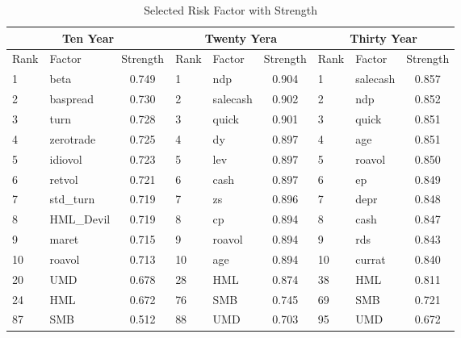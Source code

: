 \begin{table}[]
	\centering
	\caption{Selected Risk Factor with Strength}
	\begin{tabular}{llc|llc|llc}
		\hline
		\multicolumn{3}{c|}{Ten Year} & \multicolumn{3}{c|}{Twenty Yera} & \multicolumn{3}{c}{Thirty Year} \\ \hline
		Rank & Factor     & Strength & Rank   & Factor     & Strength   & Rank   & Factor     & Strength   \\ \hline
		1    & beta       & 0.749    & 1      & ndp        & 0.904      & 1      & salecash   & 0.857      \\
		2    & baspread   & 0.730    & 2      & salecash   & 0.902      & 2      & ndp        & 0.852      \\
		3    & turn       & 0.728    & 3      & quick      & 0.901      & 3      & quick      & 0.851      \\
		4    & zerotrade  & 0.725    & 4      & dy         & 0.897      & 4      & age        & 0.851      \\
		5    & idiovol    & 0.723    & 5      & lev        & 0.897      & 5      & roavol     & 0.850      \\
		6    & retvol     & 0.721    & 6      & cash       & 0.897      & 6      & ep         & 0.849      \\
		7    & std\_turn  & 0.719    & 7      & zs         & 0.896      & 7      & depr       & 0.848      \\
		8    & HML\_Devil & 0.719    & 8      & cp         & 0.894      & 8      & cash       & 0.847      \\
		9    & maret      & 0.715    & 9      & roavol     & 0.894      & 9      & rds        & 0.843      \\
		10   & roavol     & 0.713    & 10     & age        & 0.894      & 10     & currat     & 0.840      \\
		20   & UMD        & 0.678    & 28     & HML        & 0.874      & 38     & HML        & 0.811      \\
		24   & HML        & 0.672    & 76     & SMB        & 0.745      & 69     & SMB        & 0.721      \\
		87   & SMB        & 0.512    & 88     & UMD        & 0.703      & 95     & UMD        & 0.672      \\ \hline
	\end{tabular}
\end{table}

